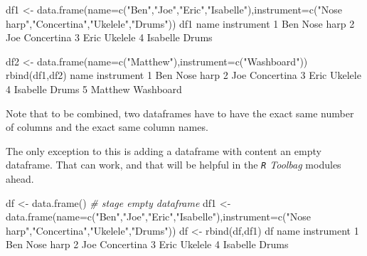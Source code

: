 \documentclass[
]{book}
\newenvironment{Shaded}{\begin{snugshade}}{\end{snugshade}}
\newcommand{\AttributeTok}[1]{\textcolor[rgb]{0.77,0.63,0.00}{#1}}
\newcommand{\CommentTok}[1]{\textcolor[rgb]{0.56,0.35,0.01}{\textit{#1}}}
\newcommand{\DecValTok}[1]{\textcolor[rgb]{0.00,0.00,0.81}{#1}}
\newcommand{\FunctionTok}[1]{\textcolor[rgb]{0.00,0.00,0.00}{#1}}
\newcommand{\NormalTok}[1]{#1}
\newcommand{\OtherTok}[1]{\textcolor[rgb]{0.56,0.35,0.01}{#1}}
\newcommand{\StringTok}[1]{\textcolor[rgb]{0.31,0.60,0.02}{#1}}
\begin{document}
\begin{Shaded}
\begin{Highlighting}[]
\NormalTok{df1 }\OtherTok{\textless{}{-}} \FunctionTok{data.frame}\NormalTok{(}\AttributeTok{name=}\FunctionTok{c}\NormalTok{(}\StringTok{"Ben"}\NormalTok{,}\StringTok{"Joe"}\NormalTok{,}\StringTok{"Eric"}\NormalTok{,}\StringTok{"Isabelle"}\NormalTok{),}\AttributeTok{instrument=}\FunctionTok{c}\NormalTok{(}\StringTok{"Nose harp"}\NormalTok{,}\StringTok{"Concertina"}\NormalTok{,}\StringTok{"Ukelele"}\NormalTok{,}\StringTok{"Drums"}\NormalTok{))}
\NormalTok{df1}
\NormalTok{      name instrument}
\DecValTok{1}\NormalTok{      Ben  Nose harp}
\DecValTok{2}\NormalTok{      Joe Concertina}
\DecValTok{3}\NormalTok{     Eric    Ukelele}
\DecValTok{4}\NormalTok{ Isabelle      Drums}

\NormalTok{df2 }\OtherTok{\textless{}{-}} \FunctionTok{data.frame}\NormalTok{(}\AttributeTok{name=}\FunctionTok{c}\NormalTok{(}\StringTok{"Matthew"}\NormalTok{),}\AttributeTok{instrument=}\FunctionTok{c}\NormalTok{(}\StringTok{"Washboard"}\NormalTok{))}
\FunctionTok{rbind}\NormalTok{(df1,df2)}
\NormalTok{      name instrument}
\DecValTok{1}\NormalTok{      Ben  Nose harp}
\DecValTok{2}\NormalTok{      Joe Concertina}
\DecValTok{3}\NormalTok{     Eric    Ukelele}
\DecValTok{4}\NormalTok{ Isabelle      Drums}
\DecValTok{5}\NormalTok{  Matthew  Washboard}
\end{Highlighting}
\end{Shaded}

Note that to be combined, two dataframes have to have the exact same number of columns and the exact same column names.

The only exception to this is adding a dataframe with content an empty dataframe. That can work, and that will be helpful in the \emph{\texttt{R} Toolbag} modules ahead.

\begin{Shaded}
\begin{Highlighting}[]
\NormalTok{df }\OtherTok{\textless{}{-}} \FunctionTok{data.frame}\NormalTok{() }\CommentTok{\# stage empty dataframe}
\NormalTok{df1 }\OtherTok{\textless{}{-}} \FunctionTok{data.frame}\NormalTok{(}\AttributeTok{name=}\FunctionTok{c}\NormalTok{(}\StringTok{"Ben"}\NormalTok{,}\StringTok{"Joe"}\NormalTok{,}\StringTok{"Eric"}\NormalTok{,}\StringTok{"Isabelle"}\NormalTok{),}\AttributeTok{instrument=}\FunctionTok{c}\NormalTok{(}\StringTok{"Nose harp"}\NormalTok{,}\StringTok{"Concertina"}\NormalTok{,}\StringTok{"Ukelele"}\NormalTok{,}\StringTok{"Drums"}\NormalTok{))}
\NormalTok{df }\OtherTok{\textless{}{-}} \FunctionTok{rbind}\NormalTok{(df,df1)}
\NormalTok{df}
\NormalTok{      name instrument}
\DecValTok{1}\NormalTok{      Ben  Nose harp}
\DecValTok{2}\NormalTok{      Joe Concertina}
\DecValTok{3}\NormalTok{     Eric    Ukelele}
\DecValTok{4}\NormalTok{ Isabelle      Drums}
\end{Highlighting}
\end{Shaded}
\end{document}
